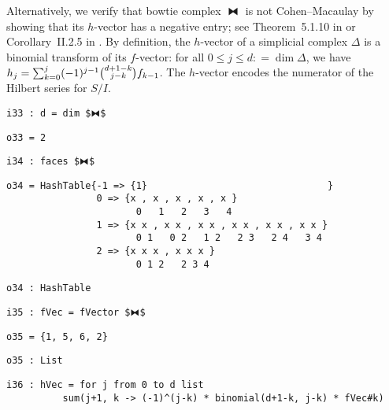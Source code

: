\documentclass[12pt,leqno]{amsart}
\theoremstyle{definition}
\newcommand{\colequal}{\ensuremath{:\!=}}
\begin{document}
Alternatively, we verify that bowtie complex $⧓$ is not Cohen--Macaulay by
showing that its $h$-vector has a negative entry; see Theorem~5.1.10 in
\cite{BH} or Corollary~II.2.5 in \cite{Stanley}.  By definition, the
$h$-vector of a simplicial complex $\Delta$ is a binomial transform of its
$f\!$-vector: for all $0 \leqslant j \leqslant d \colequal \dim \Delta$, we have
$h_j = \sum_{k=0}^{j} (-1)^{j-1}
\smash{\tbinom{d+1-k}{\raisebox{3pt}{$\scriptstyle j-k$}}} f_{k-1}$.  The
$h$-vector encodes the numerator of the Hilbert series for $S/I$.

\begin{lstlisting}[xleftmargin=10pt, aboveskip=5.0pt, belowskip=1.5pt]
i33 : d = dim $⧓$
\end{lstlisting}
\vfill
\begin{lstlisting}[xleftmargin=10pt, aboveskip=1.5pt, belowskip=1.5pt]
o33 = 2
\end{lstlisting}
\begin{lstlisting}[xleftmargin=10pt, aboveskip=1.5pt, belowskip=1.5pt]
i34 : faces $⧓$
\end{lstlisting}
\begin{lstlisting}[xleftmargin=10pt, lineskip=-10pt, aboveskip=4pt, belowskip=1pt]
o34 = HashTable{-1 => {1}                                }
                0 => {x , x , x , x , x }
                       0   1   2   3   4
                1 => {x x , x x , x x , x x , x x , x x }
                       0 1   0 2   1 2   2 3   2 4   3 4
                2 => {x x x , x x x }
                       0 1 2   2 3 4
\end{lstlisting}
\begin{lstlisting}[xleftmargin=10pt, aboveskip=1.5pt, belowskip=1.5pt]
o34 : HashTable
\end{lstlisting}
\begin{lstlisting}[xleftmargin=10pt, aboveskip=1.5pt, belowskip=1.5pt]
i35 : fVec = fVector $⧓$
\end{lstlisting}
\begin{lstlisting}[xleftmargin=10pt, aboveskip=1.5pt, belowskip=1.5pt]
o35 = {1, 5, 6, 2}
\end{lstlisting}
\begin{lstlisting}[xleftmargin=10pt, aboveskip=1.5pt, belowskip=1.5pt]
o35 : List
\end{lstlisting}
\begin{lstlisting}[xleftmargin=10pt, lineskip=-10pt, aboveskip=4pt, belowskip=1pt]
i36 : hVec = for j from 0 to d list 
          sum(j+1, k -> (-1)^(j-k) * binomial(d+1-k, j-k) * fVec#k)
\end{lstlisting}
\end{document}
